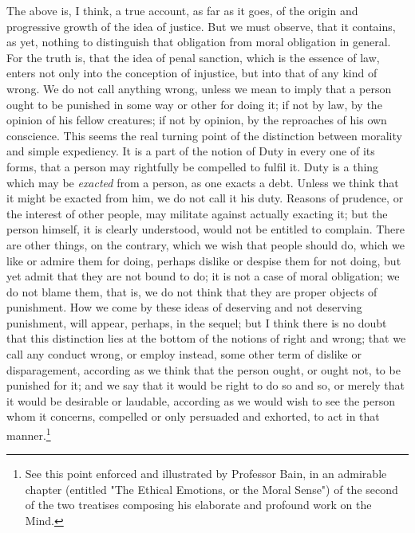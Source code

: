 \documentclass[12pt]{report}
\begin{document}
The above is, I think, a true account, as far as it goes, of the origin and progressive growth of the idea of justice. But we must observe, that it contains, as yet, nothing to distinguish that obligation from moral obligation in general. For the truth is, that the idea of penal sanction, which is the essence of law, enters not only into the conception of injustice, but into that of any kind of wrong. We do not call anything wrong, unless we mean to imply that a person ought to be punished in some way or other for doing it; if not by law, by the opinion of his fellow creatures; if not by opinion, by the reproaches of his own conscience. This seems the real turning point of the distinction between morality and simple expediency. It is a part of the notion of Duty in every one of its forms, that a person may rightfully be compelled to fulfil it. Duty is a thing which may be \emph{exacted} from a person, as one exacts a debt. Unless we think that it might be exacted from him, we do not call it his duty. Reasons of prudence, or the interest of other people, may militate against actually exacting it; but the person himself, it is clearly understood, would not be entitled to complain. There are other things, on the contrary, which we wish that people should do, which we like or admire them for doing, perhaps dislike or despise them for not doing, but yet admit that they are not bound to do; it is not a case of moral obligation; we do not blame them, that is, we do not think that they are proper objects of punishment. How we come by these ideas of deserving and not deserving punishment, will appear, perhaps, in the sequel; but I think there is no doubt that this distinction lies at the bottom of the notions of right and wrong; that we call any conduct wrong, or employ instead, some other term of dislike or disparagement, according as we think that the person ought, or ought not, to be punished for it; and we say that it would be right to do so and so, or merely that it would be desirable or laudable, according as we would wish to see the person whom it concerns, compelled or only persuaded and exhorted, to act in that manner.\footnote{See this point enforced and illustrated by Professor Bain, in an admirable chapter (entitled "The Ethical Emotions, or the Moral Sense") of the second of the two treatises composing his elaborate and profound work on the Mind.}
\end{document}
